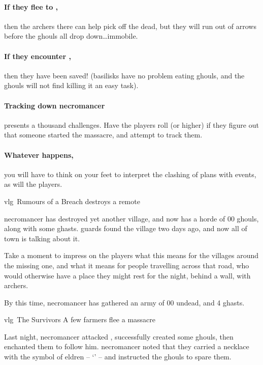 \paragraph{If they flee to ,}
then the archers there can help pick off the dead, but they will run out of arrows before the ghouls all drop down\ldots immobile.

\paragraph{If they encounter ,}
then they have been saved!
(\glspl{basilisk} have no problem eating ghouls, and the ghouls will not find killing it an easy task).

\paragraph{Tracking down \gls{necromancer}}
presents a thousand challenges.
Have the players roll  (\tn[14] or higher) if they figure out that someone started the massacre, and attempt to track them.

\paragraph{Whatever happens,}
you will have to think on your feet to interpret the clashing of plans with events, as will the players.

{\gls{vlg}~\squash Rumours of a Breach}%
{ destroys a remote }%
\label{necroRumours}

\Gls{necromancer} has destroyed yet another \gls{village}, and now has a horde of 00 ghouls, along with some ghasts.
\Glspl{guard} found the \gls{village} two days ago, and now all of \gls{town} is talking about it.

Take a moment to impress on the players what this means for the \glspl{village} around the missing one, and what it means for people travelling across that road, who would otherwise have a place they might rest for the night, behind a wall, with archers.

By this time, \gls{necromancer} has gathered an army of 00 undead, and 4 ghasts.

{\gls{vlg}~The Survivors}%
{A few farmers flee a massacre}%

\begin{exampletext}
  Last night, \gls{necromancer} attacked , successfully created some ghouls, then enchanted them to follow him.
  \Gls{necromancer} noted that they carried a necklace with the symbol of \gls{eldren} -- `' -- and instructed the ghouls to spare them.
\end{exampletext}

